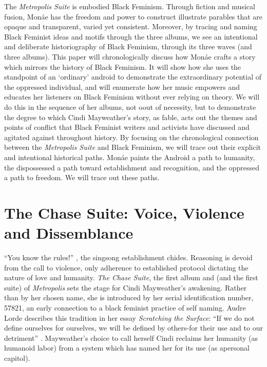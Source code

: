 \documentclass[a4paper, 11pt]{article} %
\begin{document}
The \emph{Metropolis Suite} is embodied Black Feminism.
Through fiction and musical fusion, Mon\'ae has the freedom and power to construct illustrate parables that are opaque and transparent, varied yet consistent.
Moreover, by tracing and naming Black Feminist ideas and motifs through the three albums, we see an intentional and deliberate historiography of Black Feminism, through its three waves (and three albums).
This paper will chronologically discuss how Mon\'ae crafts a story which mirrors the history of Black Feminism.
It will show how she uses the standpoint of an `ordinary' android to demonstrate the extraordinary potential of the oppressed individual, and will enumerate how her music empowers and educates her listeners on Black Feminism without ever relying on theory.
We will do this in the sequence of her albums, not oout of necessity, but to demonstrate the degree to which Cindi Mayweather's story, as fable, acts out the themes and points of conflict that Black Feminist writers and activists have discussed and agitated against throughout history.
By focusing on the chronological connection between the \emph{Metropolis Suite} and Black Feminism, we will trace out their explicit and intentional historical paths.  
Mon\'ae paints the Android a path to humanity, the dispossessed a path toward establishment and recognition, and the oppressed a path to freedom.
We will trace out these paths. 


\section*{The Chase Suite: Voice, Violence and Dissemblance}

``You know the rules!'' , the singsong establishment chides.
Reasoning is devoid from the call to violence, only adherence to established protocol dictating the nature of love and humanity.
\emph{The Chase Suite}, the first album and (and the first suite) of \emph{Metropolis} sets the stage for Cindi Mayweather's awakening.
Rather than by her chosen name, she is introduced by her serial identification number, 57821, an early connection to a black feminist practice of self naming. 
Audre Lorde describes this tradition in her essay \emph{Scratching the Surface}: ``If we do not define ourselves for ourselves, we will be defined by others-for their use and to our detriment'' .
Mayweather's choice to call herself Cindi reclaims her humanity (as humanoid labor) from a system which has named her for its use (as apersonal capitol).
\end{document}
